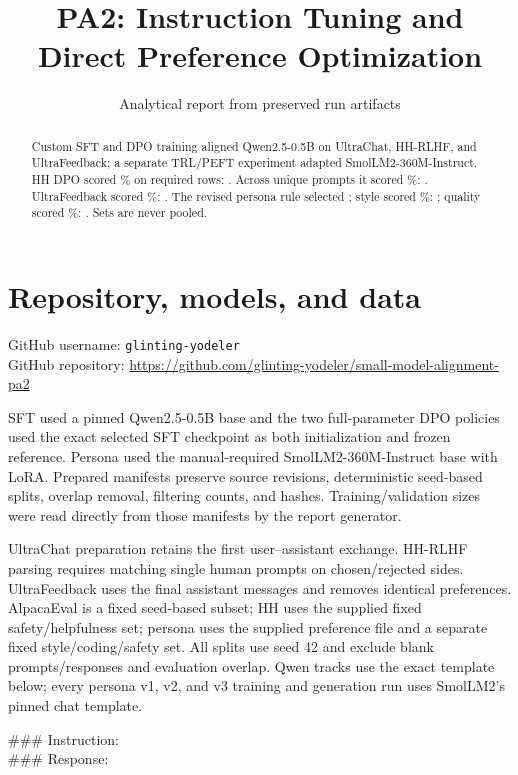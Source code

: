 \documentclass[10pt,a4paper]{article}
\title{PA2: Instruction Tuning and Direct Preference Optimization}
\author{Analytical report from preserved run artifacts}
\date{}
\begin{document}
\maketitle\vspace{-1.5em}
\begin{abstract}\small
Custom SFT and DPO training aligned Qwen2.5-0.5B on UltraChat, HH-RLHF, and UltraFeedback; a separate TRL/PEFT experiment adapted SmolLM2-360M-Instruct. HH DPO scored \HHScore\% on required rows: \HHRowsVerdict. Across \HHUniqueN{} unique prompts it scored \HHUniqueScore\%: \HHUniqueVerdict. UltraFeedback scored \UFScore\%: \UFVerdict. The revised persona rule selected \PersonaSelected; style scored \PersonaStyleScore\%: \PersonaStyleVerdict; quality scored \PersonaQualityScore\%: \PersonaQualityVerdict. Sets are never pooled.
\end{abstract}


\section{Repository, models, and data}
GitHub username: \texttt{glinting-yodeler}\\
GitHub repository: \url{https://github.com/glinting-yodeler/small-model-alignment-pa2}

SFT used a pinned Qwen2.5-0.5B base and the two full-parameter DPO policies used the exact selected SFT checkpoint as both initialization and frozen reference. Persona used the manual-required SmolLM2-360M-Instruct base with LoRA. Prepared manifests preserve source revisions, deterministic seed-based splits, overlap removal, filtering counts, and hashes. Training/validation sizes were read directly from those manifests by the report generator.

UltraChat preparation retains the first user--assistant exchange. HH-RLHF parsing requires matching single human prompts on chosen/rejected sides. UltraFeedback uses the final assistant messages and removes identical preferences. AlpacaEval is a fixed seed-based subset; HH uses the supplied fixed safety/helpfulness set; persona uses the supplied preference file and a separate fixed style/coding/safety set. All splits use seed 42 and exclude blank prompts/responses and evaluation overlap. Qwen tracks use the exact template below; every persona v1, v2, and v3 training and generation run uses SmolLM2's pinned chat template.
\begin{center}\small\ttfamily \#\#\# Instruction:\quad[instruction]\\[2pt]\#\#\# Response:\end{center}
\end{document}

